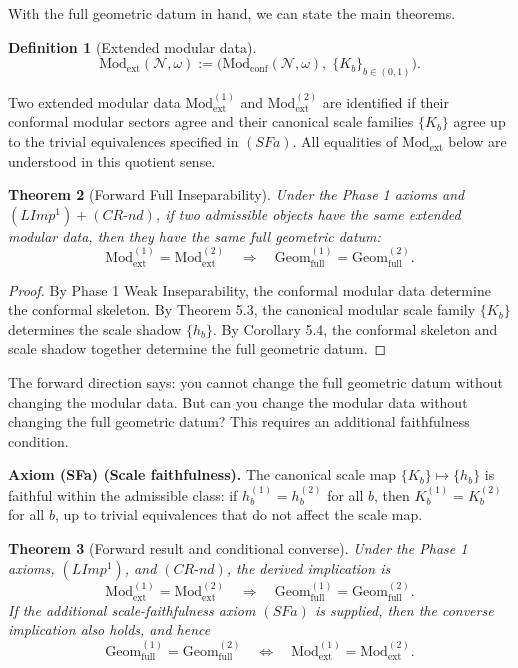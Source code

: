 \documentclass[12pt]{article}
\newtheorem{theorem}{Theorem}[section]
\theoremstyle{definition}
\newtheorem{definition}[theorem]{Definition}
\theoremstyle{remark}
\begin{document}
With the full geometric datum in hand, we can state the main theorems.

\begin{definition}[Extended modular data]\label{def:5.5}
\[
\mathrm{Mod}_{\mathrm{ext}}(\mathcal{N},\omega)
:=
\big(\mathrm{Mod}_{\mathrm{conf}}(\mathcal{N},\omega),\; \{K_b\}_{b \in (0,1)}\big).
\]
\end{definition}

Two extended modular data
\(\mathrm{Mod}_{\mathrm{ext}}^{(1)}\) and
\(\mathrm{Mod}_{\mathrm{ext}}^{(2)}\) are identified if their conformal
modular sectors agree and their canonical scale families \(\{K_b\}\)
agree up to the trivial equivalences specified in \((SFa)\). All
equalities of \(\mathrm{Mod}_{\mathrm{ext}}\) below are understood in
this quotient sense.

\begin{theorem}[Forward Full Inseparability]\label{thm:5.6}
Under the Phase 1
axioms and \((LImp^1) + (CR\text{-}nd)\), if two admissible objects have
the same extended modular data, then they have the same full geometric
datum:
\[
\mathrm{Mod}_{\mathrm{ext}}^{(1)} = \mathrm{Mod}_{\mathrm{ext}}^{(2)}
\quad \Longrightarrow \quad
\mathrm{Geom}_{\mathrm{full}}^{(1)} = \mathrm{Geom}_{\mathrm{full}}^{(2)}.
\]
\end{theorem}

\begin{proof}
By Phase 1 Weak Inseparability, the conformal modular
data determine the conformal skeleton. By Theorem 5.3, the canonical
modular scale family \(\{K_b\}\) determines the scale shadow
\(\{h_b\}\). By Corollary 5.4, the conformal skeleton and scale shadow
together determine the full geometric datum.
\end{proof}

The forward direction says: you cannot change the full geometric datum
without changing the modular data. But can you change the modular data
without changing the full geometric datum? This requires an additional
faithfulness
condition.

\textbf{Axiom (SFa) (Scale faithfulness).} The canonical scale map
\(\{K_b\} \mapsto \{h_b\}\) is faithful within the admissible class: if
\(h_b^{(1)} = h_b^{(2)}\) for all \(b\), then \(K_b^{(1)} = K_b^{(2)}\)
for all \(b\), up to trivial equivalences that do not affect the scale
map.

\begin{theorem}[Forward result and conditional converse]\label{thm:5.7}
Under the Phase 1 axioms, \((LImp^1)\), and
\((CR\text{-}nd)\), the derived implication is
\[
\mathrm{Mod}_{\mathrm{ext}}^{(1)} = \mathrm{Mod}_{\mathrm{ext}}^{(2)}
\quad \Longrightarrow \quad
\mathrm{Geom}_{\mathrm{full}}^{(1)} = \mathrm{Geom}_{\mathrm{full}}^{(2)}.
\]
If the additional scale-faithfulness axiom \((SFa)\) is supplied, then
the converse implication also holds, and hence
\[
\mathrm{Geom}_{\mathrm{full}}^{(1)} = \mathrm{Geom}_{\mathrm{full}}^{(2)}
\quad \Longleftrightarrow \quad
\mathrm{Mod}_{\mathrm{ext}}^{(1)} = \mathrm{Mod}_{\mathrm{ext}}^{(2)}.
\]
\end{theorem}
\end{document}
